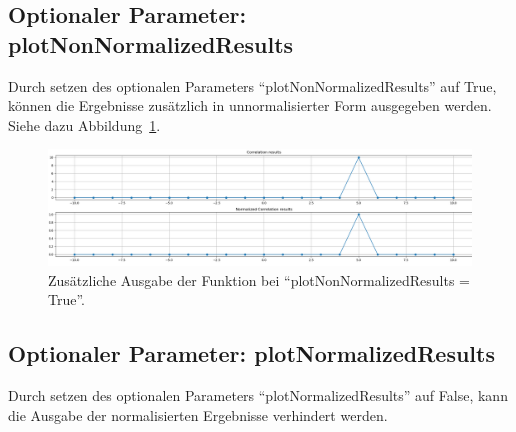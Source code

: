 \subsection{Optionaler Parameter: plotNonNormalizedResults}
Durch setzen des optionalen Parameters \enquote{plotNonNormalizedResults} auf True, können die Ergebnisse zusätzlich in unnormalisierter Form ausgegeben werden.
Siehe dazu Abbildung~\ref{fig:correlationPlotNonNormalizedResults}. 
\begin{figure}[H]
    \includegraphics[width=\linewidth]{./images/correlationPlotNonNormalizedResults.PNG}
    \caption[Ergebnis: plotNonNormalizedResults]{Zusätzliche Ausgabe der Funktion bei \enquote{plotNonNormalizedResults = True}\footnotemark. }
    \label{fig:correlationPlotNonNormalizedResults}
\end{figure}

\subsection{Optionaler Parameter: plotNormalizedResults}
Durch setzen des optionalen Parameters \enquote{plotNormalizedResults} auf False, kann die Ausgabe der normalisierten Ergebnisse verhindert werden.

